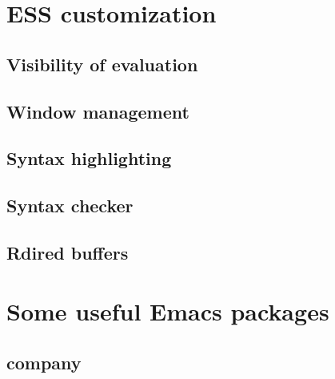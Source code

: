\documentclass[presentation]{beamer}
\begin{document}
\section{ESS customization}
\label{sec:org9bb69c3}
\subsection{Visibility of evaluation}
\label{sec:org8a4075e}
\subsection{Window management}
\label{sec:orgff03789}
\subsection{Syntax highlighting}
\label{sec:org3d76d4e}
\subsection{Syntax checker}
\label{sec:org1e82b80}
\subsection{Rdired buffers}
\label{sec:org5db3bff}

\section{Some useful Emacs packages}
\label{sec:org4bdb453}
\subsection{company}
\label{sec:org4b6bae0}
\end{document}
